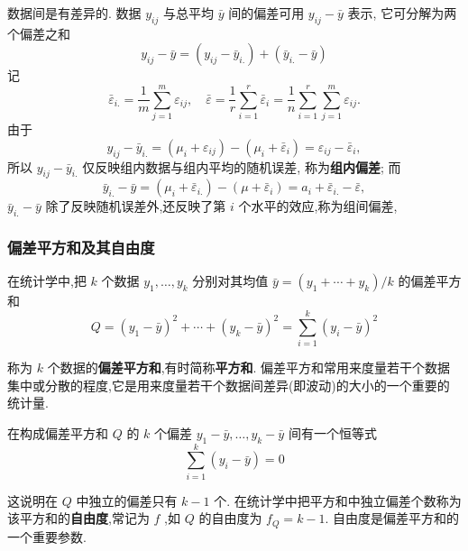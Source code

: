 数据间是有差异的. 数据 $y_{ij}$ 与总平均 $\bar{y}$ 间的偏差可用 $y_{ij} - \bar{y}$ 表示, 它可分解为两个偏差之和
\begin{equation}\label{eq:8.1.10}
  y_{ij}-\bar{y}=(y_{ij}-\bar{y}_{i.})+(\bar{y}_{i.}-\bar{y})
\end{equation}
记
\begin{equation*}
  \bar{\varepsilon}_{i.} =\frac{1}{m} \sum_{j=1}^{m} \varepsilon_{ij}, \quad \bar{\varepsilon}=\frac{1}{r} \sum_{i=1}^{r} \bar{\varepsilon}_{i} = \frac{1}{n} \sum_{i=1}^{r} \sum_{j=1}^{m} \varepsilon_{ij}.
\end{equation*}
由于
\begin{equation}\label{eq:8.1.11}
  y_{i j}-\bar{y}_{i.}=(\mu_{i}+\varepsilon_{i j})-(\mu_{i}+\bar{\varepsilon}_{i})=\varepsilon_{i j}-\bar{\varepsilon}_{i},
\end{equation}
所以 $y_{ij} - \bar{y}_{i.}$ 仅反映组内数据与组内平均的随机误差, 称为\textbf{组内偏差}; 而
\begin{equation}\label{eq:8.1.12}
  \bar{y}_{i.}-\bar{y} = (\mu_{i}+ \bar{\varepsilon}_{i.})-(\mu +\bar{\varepsilon}_{i})= a_i + \bar{\varepsilon}_{i.}-\bar{\varepsilon},
\end{equation}
$\bar{y}_{i.} - \bar{y}$ 除了反映随机误差外,还反映了第 $i$ 个水平的效应,称为组间偏差,

\subsubsection{偏差平方和及其自由度}

在统计学中,把 $k$ 个数据 $y_1,\ldots,y_k$ 分别对其均值 $\bar{y}=(y_1+\cdots+y_{k}) / k$ 的偏差平方和
\begin{equation*}
  Q=\left(y_{1}-\bar{y}\right)^{2}+\cdots+\left(y_{k}-\bar{y}\right)^{2}=\sum_{i=1}^{k}\left(y_{i}-\bar{y}\right)^{2}
\end{equation*}

称为 $k$ 个数据的\textbf{偏差平方和},有时简称\textbf{平方和}. 偏差平方和常用来度量若干个数据集中或分散的程度,它是用来度量若干个数据间差异(即波动)的大小的一个重要的统计量.

在构成偏差平方和 $Q$ 的 $k$ 个偏差 $y_1 - \bar{y}, \ldots, y_{k} - \bar{y}$ 间有一个恒等式
\begin{equation*}
  \sum_{i=1}^{k}\left(y_{i}-\bar{y}\right)=0
\end{equation*}

这说明在 $Q$ 中独立的偏差只有 $k-1$ 个. 在统计学中把平方和中独立偏差个数称为该平方和的\textbf{自由度},常记为 $f$ ,如 $Q$ 的自由度为 $f_{Q}=k-1$. 自由度是偏差平方和的一个重要参数.

